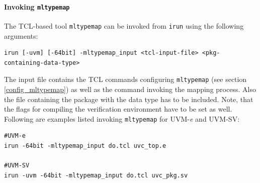 \paragraph{Invoking \lstinline$mltypemap$}
The TCL-based tool \lstinline$mltypemap$ can be invoked from \lstinline$irun$ using the following arguments:
{}
\begin{lstlisting}
irun [-uvm] [-64bit] -mltypemap_input <tcl-input-file> <pkg-containing-data-type>
\end{lstlisting} 
The input file contains the TCL commands configuring \lstinline$mltypemap$ (see section \ref{config_mltypemap}) as well as the command invoking the mapping process. Also the file containing the package with the data type has to be included.
Note, that the flags for compiling the verification environment have to be set as well. Following are examples listed invoking \lstinline$mltypemap$ for UVM-\textit{e} and UVM-SV:
{}
\begin{lstlisting}
#UVM-e
irun -64bit -mltypemap_input do.tcl uvc_top.e

#UVM-SV
irun -uvm -64bit -mltypemap_input do.tcl uvc_pkg.sv
\end{lstlisting} 
